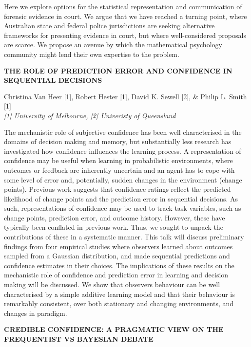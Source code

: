 \documentclass[]{article}
\begin{document}
Here we explore options for the statistical representation and
communication of forensic evidence in court. We argue that we have
reached a turning point, where Australian state and federal police
jurisdictions are seeking alternative frameworks for presenting evidence
in court, but where well-considered proposals are scarce. We propose an
avenue by which the mathematical psychology community might lend their
own expertise to the problem.\\
\pagebreak  

\textbf{THE ROLE OF PREDICTION ERROR AND CONFIDENCE IN SEQUENTIAL
DECISIONS }

Christina Van Heer {[}1{]}, Robert Hester {[}1{]}, David K. Sewell
{[}2{]}, \& Philip L. Smith {[}1{]}\\
\emph{{[}1{]} University of Melbourne, {[}2{]} Univeristy of Queensland}

The mechanistic role of subjective confidence has been well
characterised in the domains of decision making and memory, but
substantially less research has investigated how confidence influences
the learning process. A representation of confidence may be useful when
learning in probabilistic environments, where outcomes or feedback are
inherently uncertain and an agent has to cope with some level of error
and, potentially, sudden changes in the environment (change points).
Previous work suggests that confidence ratings reflect the predicted
likelihood of change points and the prediction error in sequential
decisions. As such, representations of confidence may be used to track
task variables, such as change points, prediction error, and outcome
history. However, these have typically been conflated in previous work.
Thus, we sought to unpack the contributions of these in a systematic
manner. This talk will discuss preliminary findings from four empirical
studies where observers learned about outcomes sampled from a Gaussian
distribution, and made sequential predictions and confidence estimates
in their choices. The implications of these results on the mechanistic
role of confidence and prediction error in learning and decision making
will be discussed. We show that observers behaviour can be well
characterised by a simple additive learning model and that their
behaviour is remarkably consistent, over both stationary and changing
environments, and changes in paradigm.\\
\pagebreak  

\textbf{CREDIBLE CONFIDENCE: A PRAGMATIC VIEW ON THE FREQUENTIST VS
BAYESIAN DEBATE}
\end{document}
